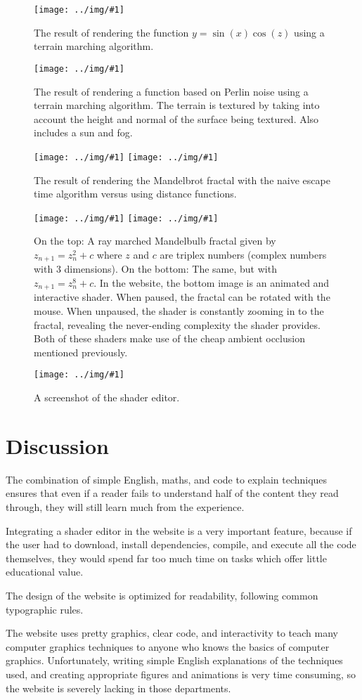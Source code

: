 \documentclass[parskip=full]{scrartcl}
\newcommand\graphic[1]{\texttt{[image: ../img/\#1]}}
\begin{document}
\begin{figure}[H]
    \graphic{sinxcosz.png}
    \caption{The result of rendering the function $y=\sin(x)\cos(z)$ using a
        terrain marching algorithm.}
    \bigskip
    \graphic{terrain-marching.png}
    \caption{The result of rendering a function based on Perlin noise using a
        terrain marching algorithm. The terrain is textured by taking into
        account the height and normal of the surface being textured. Also
        includes a sun and fog.}
\end{figure}

\begin{figure}[H]
    \graphic{mandelbrot-escape-time.png}
    \graphic{mandelbrot-dist-func.png}
    \caption{The result of rendering the Mandelbrot fractal with the naive
        escape time algorithm versus using distance functions.}
\end{figure}

\begin{figure}[H]
    \graphic{mandelbulb2.png}
    \graphic{mandelbulb8.png}
    \caption{On the top: A ray marched Mandelbulb fractal given by
        $z_{n+1}=z_n^2+c$ where $z$ and $c$ are triplex numbers (complex
        numbers with 3 dimensions). On the bottom: The same, but with
        $z_{n+1}=z_n^8+c$. In the website, the bottom image is an animated and
        interactive shader. When paused, the fractal can be rotated with the
        mouse. When unpaused, the shader is constantly zooming in to the
        fractal, revealing the never-ending complexity the shader provides.
        Both of these shaders make use of the cheap ambient occlusion mentioned
        previously.}
\end{figure}

\begin{figure}[H]
    \graphic{editor.png}
    \caption{A screenshot of the shader editor.}
\end{figure}

\section{Discussion}

The combination of simple English, maths, and code to explain techniques
ensures that even if a reader fails to understand half of the content they read
through, they will still learn much from the experience.

Integrating a shader editor in the website is a very important feature, because
if the user had to download, install dependencies, compile, and execute all the
code themselves, they would spend far too much time on tasks which offer little
educational value.

The design of the website is optimized for readability, following common
typographic rules.

The website uses pretty graphics, clear code, and interactivity to teach many
computer graphics techniques to anyone who knows the basics of computer
graphics. Unfortunately, writing simple English explanations of the techniques
used, and creating appropriate figures and animations is very time consuming,
so the website is severely lacking in those departments.

\nocite{*}
\printbibliography
\end{document}
